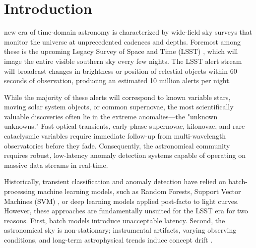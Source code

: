 \documentclass[10pt,journal,compsoc]{IEEEtran}
\begin{document}
\maketitle
\IEEEdisplaynontitleabstractindextext
\IEEEpeerreviewmaketitle

\section{Introduction}
 new era of time-domain astronomy is characterized by wide-field sky surveys that monitor the universe at unprecedented cadences and depths. Foremost among these is the upcoming Legacy Survey of Space and Time (LSST) \cite{ivezic2019lsst}, which will image the entire visible southern sky every few nights. The LSST alert stream will broadcast changes in brightness or position of celestial objects within 60 seconds of observation, producing an estimated 10 million alerts per night. 

While the majority of these alerts will correspond to known variable stars, moving solar system objects, or common supernovae, the most scientifically valuable discoveries often lie in the extreme anomalies—the "unknown unknowns." Fast optical transients, early-phase supernovae, kilonovae, and rare cataclysmic variables require immediate follow-up from multi-wavelength observatories before they fade. Consequently, the astronomical community requires robust, low-latency anomaly detection systems capable of operating on massive data streams in real-time.

Historically, transient classification and anomaly detection have relied on batch-processing machine learning models, such as Random Forests, Support Vector Machines (SVM) \cite{scholkopf2001estimating}, or deep learning models applied post-facto to light curves. However, these approaches are fundamentally unsuited for the LSST era for two reasons. First, batch models introduce unacceptable latency. Second, the astronomical sky is non-stationary; instrumental artifacts, varying observing conditions, and long-term astrophysical trends induce concept drift \cite{gama2014survey}.
\end{document}
